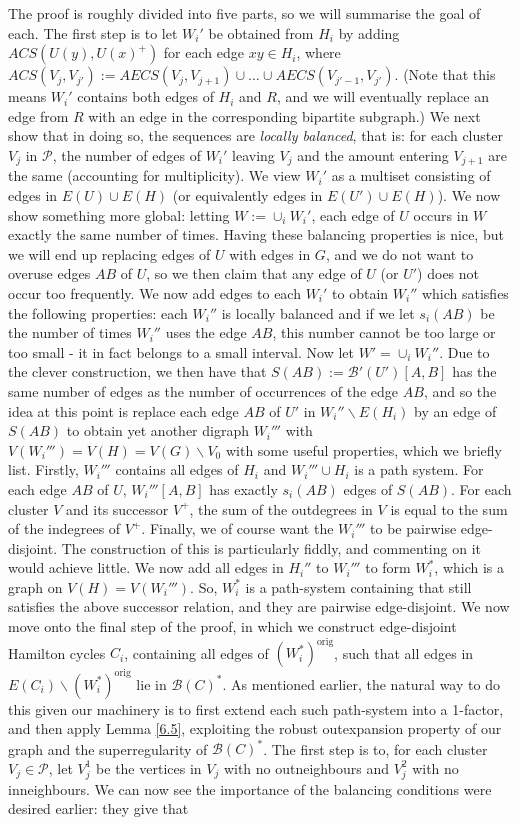 \documentclass[10pt,letterpaper, reqno]{amsart}
\theoremstyle{definition}
\numberwithin{equation}{section}
\begin{document}
The proof is roughly divided into five parts, so we will summarise the goal of each. The first step is to let $W_i'$ be obtained from $H_i$ by adding $ACS(U(y),U(x)^+)$ for each edge $xy \in H_i$, where $ACS(V_j, V_{j'}):=AECS(V_j, V_{j+1}) \cup \dots \cup AECS(V_{j'-1}, V_{j'})$. (Note that this means $W_i'$ contains both edges of $H_i$ and $R$, and we will eventually replace an edge from $R$ with an edge in the corresponding bipartite subgraph.) We next show that in doing so, the sequences are \textit{locally balanced}, that is: for each cluster $V_j$ in $\mathcal{P}$, the number of edges of $W_i'$ leaving $V_j$ and the amount entering $V_{j+1}$ are the same (accounting for multiplicity). We view $W_i'$ as a multiset consisting of edges in $E(U) \cup E(H)$ (or equivalently edges in $E(U') \cup E(H)$). We now show something more global: letting $W:=\cup_i W_i'$, each edge of $U$ occurs in $W$ exactly the same number of times. Having these balancing properties is nice, but we will end up replacing edges of $U$ with edges in $G$, and we do not want to overuse edges $AB$ of $U$, so we then claim that any edge of $U$ (or $U'$) does not occur too frequently. We now add edges to each $W_i'$ to obtain $W_i''$ which satisfies the following properties: each $W_i''$ is locally balanced and if we let $s_i(AB)$ be the number of times $W_i''$ uses the edge $AB$, this number cannot be too large or too small - it in fact belongs to a small interval. Now let $W' = \cup_i W_i''$. Due to the clever construction, we then have that $S(AB):=\mathcal{B}'(U')[A,B]$ has the same number of edges as the number of occurrences of the edge $AB$, and so the idea at this point is replace each edge $AB$ of $U'$ in $W_i''\backslash E(H_i)$ by an edge of $S(AB)$ to obtain yet another digraph $W_i'''$ with $V(W_i''') = V(H) = V(G)\backslash V_0$ with some useful properties, which we briefly list. Firstly, $W_i'''$ contains all edges of $H_i$ and $W_i''' \cup H_i$ is a path system. For each edge $AB$ of $U$, $W_i'''[A,B]$ has exactly $s_i(AB)$ edges of $S(AB)$. For each cluster $V$ and its successor $V^+$, the sum of the outdegrees in $V$ is equal to the sum of the indegrees of $V^+$. Finally, we of course want the $W_i'''$ to be pairwise edge-disjoint. The construction of this is particularly fiddly, and commenting on it would achieve little. We now add all edges in $H_i''$ to $W_i'''$ to form $W_i^*$, which is a graph on $V(H)=V(W_i''')$. So, $W_i^*$ is a path-system containing that still satisfies the above successor relation, and they are pairwise edge-disjoint. We now move onto the final step of the proof, in which we construct edge-disjoint Hamilton cycles $C_i$, containing all edges of $(W_i^*)^\text{orig}$, such that all edges in $E(C_i) \backslash (W_i^*)^\text{orig}$ lie in $\mathcal{B}(C)^*$. As mentioned earlier, the natural way to do this given our machinery is to first extend each such path-system into a 1-factor, and then apply Lemma \ref{6.5}, exploiting the robust outexpansion property of our graph and the superregularity of $\mathcal{B}(C)^*$. The first step is to, for each cluster $V_j \in \mathcal{P}$, let $V^1_j$ be the vertices in $V_j$ with no outneighbours and $V^2_j$ with no inneighbours. We can now see the importance of the balancing conditions were desired earlier: they give that 
\end{document}
